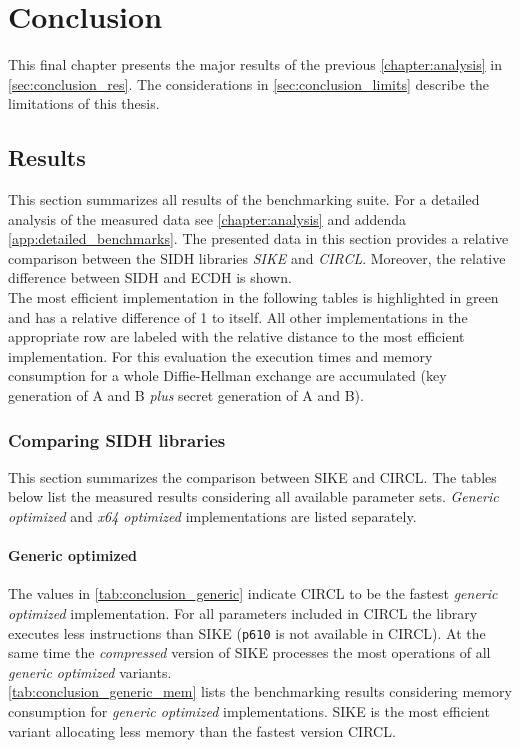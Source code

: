 \chapter{Conclusion}\label{chapter:conclusion}

This final chapter presents the major results of the previous \autoref{chapter:analysis} in \autoref{sec:conclusion_res}. The considerations in \autoref{sec:conclusion_limits} describe the limitations of this thesis.

\section{Results}\label{sec:conclusion_res}

This section summarizes all results of the benchmarking suite. For a detailed analysis of the measured data see \autoref{chapter:analysis} and addenda \ref{app:detailed_benchmarks}. The presented data in this section provides a relative comparison between the \gls{SIDH} libraries \textit{\gls{SIKE}} and \textit{\gls{CIRCL}}. Moreover, the relative difference between \gls{SIDH} and \gls{ECDH} is shown.\\
The most efficient implementation in the following tables is highlighted in green and has a relative difference of 1 to itself. All other implementations in the appropriate row are labeled with the relative distance to the most efficient implementation. For this evaluation the execution times and memory consumption for a whole Diffie-Hellman exchange are accumulated (key generation of A and B \textit{plus} secret generation of A and B).

\subsection{Comparing \gls{SIDH} libraries}
This section summarizes the comparison between \gls{SIKE} and \gls{CIRCL}. The tables below list the measured results considering all available parameter sets. \textit{Generic optimized} and \textit{x64 optimized} implementations are listed separately.

\subsubsection{Generic optimized}
The values in \autoref{tab:conclusion_generic} indicate \gls{CIRCL} to be the fastest \textit{generic optimized} implementation. For all parameters included in \gls{CIRCL} the library executes less instructions than \gls{SIKE} (\texttt{p610} is not available in \gls{CIRCL}). At the same time the \textit{compressed} version of \gls{SIKE} processes the most operations of all \textit{generic optimized} variants.\\
\autoref{tab:conclusion_generic_mem} lists the benchmarking results considering memory consumption for \textit{generic optimized} implementations. \gls{SIKE} is the most efficient variant allocating less memory than the fastest version \gls{CIRCL}.



